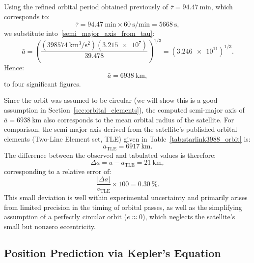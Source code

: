 \documentclass{article}
\begin{document}
Using the refined orbital period obtained previously of $\bar{\tau} = \SI{94.47}{\minute}$, which corresponds to:
\[
\bar{\tau} = \SI{94.47}{\minute} \times \SI{60}{\second\per\minute} = \SI{5668}{\second},
\]
we substitute into~\eqref{semi_major_axis_from_tau}:
\[
\bar{a} = \left( \frac{(\SI{398574}{\kilo\metre^{3}\per\second^{2}}) (\num{3.215e7})}{\num{39.478}} \right)^{1/3}
   = \left( \num{3.246e11} \right)^{1/3}.
\]
Hence:
\[
\boxed{\bar{a} = \SI{6938}{\kilo\metre}},
\]
to four significant figures.

Since the orbit was assumed to be circular (we will show this is a good assumption in Section~\ref{sec:orbital_elements}), the computed semi-major axis of $\bar{a} = \SI{6938}{\kilo\metre}$ also corresponds to the mean orbital radius of the satellite.  
For comparison, the semi-major axis derived from the satellite’s published orbital elements (Two-Line Element set, TLE) given in Table~\ref{tab:starlink3988_orbit} is:
\[
a_{\text{TLE}} = \SI{6917}{\kilo\metre}.
\]
The difference between the observed and tabulated values is therefore:
\[
\Delta a = \bar{a} - a_{\text{TLE}} = \SI{21}{\kilo\metre},
\]
corresponding to a relative error of:
\[
\frac{|\Delta a|}{a_{\text{TLE}}} \times 100 = \SI{0.30}{\percent}.
\]
This small deviation is well within experimental uncertainty and primarily arises from limited precision in the timing of orbital passes, as well as the simplifying assumption of a perfectly circular orbit ($e \approx 0$), which neglects the satellite’s small but nonzero eccentricity.

\subsection{Position Prediction via Kepler’s Equation} \label{sec:mean_anomaly}
\end{document}
